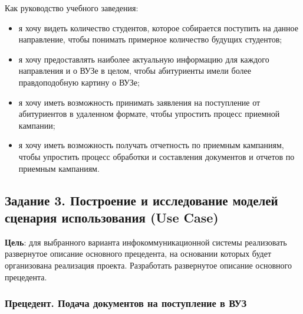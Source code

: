 \documentclass[a4paper, 14pt]{extarticle}
\begin{document}
Как руководство учебного заведения:
\begin{itemize}
  \item я хочу видеть количество студентов, которое собирается поступить на
  данное направление, чтобы понимать примерное количество будущих студентов;
  \item я хочу предоставлять наиболее актуальную информацию для каждого
  направления и о ВУЗе в целом, чтобы абитуриенты имели более правдоподобную
  картину о ВУЗе;
  \item я хочу иметь возможность принимать заявления на поступление от
  абитуриентов в удаленном формате, чтобы упростить процесс приемной кампании;
  \item я хочу иметь возможность получать отчетность по приемным кампаниям,
  чтобы упростить процесс обработки и составления документов и отчетов по
  приемным кампаниям.
\end{itemize}

\subsection*{
  Задание 3. Построение и исследование моделей сценария использования (Use Case)
}

\textbf{Цель}: для выбранного варианта инфокоммуникационной системы реализовать
развернутое описание основного прецедента, на основании которых будет
организована реализация проекта. Разработать развернутое описание основного
прецедента.

\subsubsection*{Прецедент. Подача документов на поступление в ВУЗ}
\end{document}
